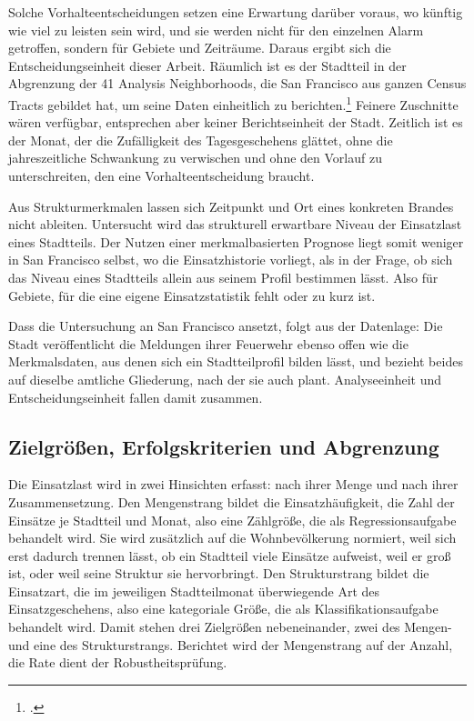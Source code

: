 \documentclass[12pt,a4paper]{article}
\begin{document}
Solche Vorhalteentscheidungen setzen eine Erwartung darüber voraus, wo künftig wie viel zu leisten sein wird, und sie werden nicht für den einzelnen Alarm getroffen, sondern für Gebiete und Zeiträume. Daraus ergibt sich die Entscheidungseinheit dieser Arbeit. Räumlich ist es der Stadtteil in der Abgrenzung der 41 Analysis Neighborhoods, die San Francisco aus ganzen Census Tracts gebildet hat, um seine Daten einheitlich zu berichten.\footcite{DataSFStadtteile} Feinere Zuschnitte wären verfügbar, entsprechen aber keiner Berichtseinheit der Stadt. Zeitlich ist es der Monat, der die Zufälligkeit des Tagesgeschehens glättet, ohne die jahreszeitliche Schwankung zu verwischen und ohne den Vorlauf zu unterschreiten, den eine Vorhalteentscheidung braucht.

Aus Strukturmerkmalen lassen sich Zeitpunkt und Ort eines konkreten Brandes nicht ableiten. Untersucht wird das strukturell erwartbare Niveau der Einsatzlast eines Stadtteils. Der Nutzen einer merkmalbasierten Prognose liegt somit weniger in San Francisco selbst, wo die Einsatzhistorie vorliegt, als in der Frage, ob sich das Niveau eines Stadtteils allein aus seinem Profil bestimmen lässt. Also für Gebiete, für die eine eigene Einsatzstatistik fehlt oder zu kurz ist.

Dass die Untersuchung an San Francisco ansetzt, folgt aus der Datenlage: Die Stadt veröffentlicht die Meldungen ihrer Feuerwehr ebenso offen wie die Merkmalsdaten, aus denen sich ein Stadtteilprofil bilden lässt, und bezieht beides auf dieselbe amtliche Gliederung, nach der sie auch plant. Analyseeinheit und Entscheidungseinheit fallen damit zusammen.


\subsection{Zielgrößen, Erfolgskriterien und Abgrenzung}
\label{sec:zielgroessen}
Die Einsatzlast wird in zwei Hinsichten erfasst: nach ihrer Menge und nach ihrer Zusammensetzung. Den Mengenstrang bildet die Einsatzhäufigkeit, die Zahl der Einsätze je Stadtteil und Monat, also eine Zählgröße, die als Regressionsaufgabe behandelt wird. Sie wird zusätzlich auf die Wohnbevölkerung normiert, weil sich erst dadurch trennen lässt, ob ein Stadtteil viele Einsätze aufweist, weil er groß ist, oder weil seine Struktur sie hervorbringt. Den Strukturstrang bildet die Einsatzart, die im jeweiligen Stadtteilmonat überwiegende Art des Einsatzgeschehens, also eine kategoriale Größe, die als Klassifikationsaufgabe behandelt wird. Damit stehen drei Zielgrößen nebeneinander, zwei des Mengen- und eine des Strukturstrangs. Berichtet wird der Mengenstrang auf der Anzahl, die Rate dient der Robustheitsprüfung.
\end{document}
